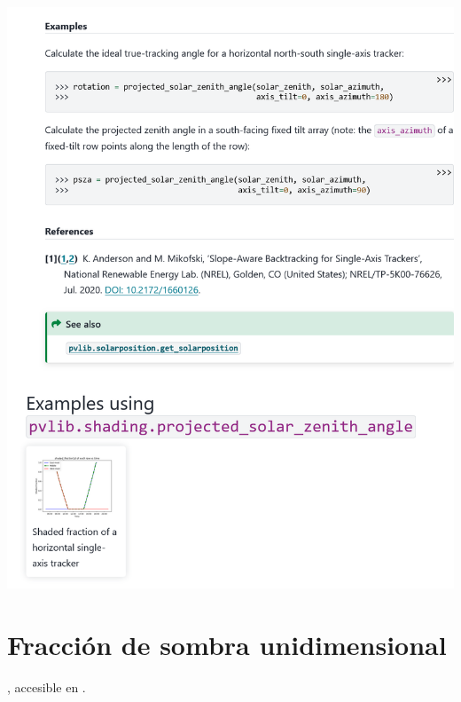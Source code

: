 \begin{myparindent}{0pt}
\includegraphics[width=\linewidth,height=0.9\textheight,keepaspectratio]{images/docs_funcs_cut/projected_solar_zenith_angle_1.png}

\newpage\section{Fracción de sombra unidimensional} \label{sct:doc_fraccion_sombra}

, accesible en .


\end{myparindent}
